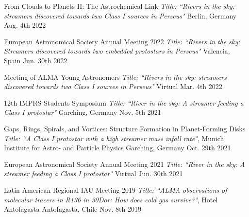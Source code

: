 \begin{cvhonors}
	 \cvhonor
	{From Clouds to Planets II: The Astrochemical Link} %
	{\textit{Title: ``Rivers in the sky: streamers discovered towards two Class I sources in Perseus"}} %
	{Berlin, Germany} %
	{Aug. 4th 2022} %


	\cvhonor
	{European Astronomical Society Annual Meeting 2022} %
	{\textit{Title: ``Rivers in the sky: Streamers discovered towards two embedded protostars in Perseus"}} %
	{Valencia, Spain} %
	{Jun. 30th 2022} %

  \cvhonor
    {Meeting of ALMA Young Astronomers} %
    {\textit{Title: ``Rivers in the sky: streamers discovered towards two Class I sources in Perseus"}} %
    { Virtual} %
    {Mar. 4th 2022} %

 
  \cvhonor
    {12th IMPRS Students Symposium} %
    {\textit{Title: ``River in the sky: A streamer feeding a Class I protostar"}}%
    {Garching, Germany} %
    {Nov. 5th 2021} %

  \cvhonor
    {Gaps, Rings, Spirals, and Vortices: Structure Formation in Planet-Forming Disks} %
    {\textit{Title: ``A Class I protostar with a high streamer mass infall rate"}, Munich Institute for Astro- and Particle Physics} %
    {Garching, Germany} %
    {Oct. 29th 2021} %

  \cvhonor
    {European Astronomical Society Annual Meeting 2021} %
    {\textit{Title: ``River in the sky: A streamer feeding a Class I protostar"}} %
    {Virtual} %
    {Jun. 30th 2021} %

  \cvhonor
    {Latin American Regional IAU Meeting 2019} %
    {\textit{Title: ``ALMA observations of molecular tracers in R136 in 30Dor: How does cold gas survive?"}, Hotel Antofagasta} %
    {Antofagasta, Chile} %
    {Nov. 8th 2019} %

\end{cvhonors}

